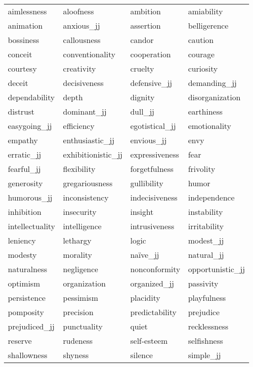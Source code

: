 \begin{table}[tbp]
    \begin{tabular}{| llll |}
        \hline
        aimlessness & aloofness & ambition & amiability \\
        animation & anxious\_jj & assertion & belligerence \\
        bossiness & callousness & candor & caution \\
        conceit & conventionality & cooperation & courage \\
        courtesy & creativity & cruelty & curiosity \\
        deceit & decisiveness & defensive\_jj & demanding\_jj \\
        dependability & depth & dignity & disorganization \\
        distrust & dominant\_jj & dull\_jj & earthiness \\
        easygoing\_jj & efficiency & egotistical\_jj & emotionality \\
        empathy & enthusiastic\_jj & envious\_jj & envy \\
        erratic\_jj & exhibitionistic\_jj & expressiveness & fear \\
        fearful\_jj & flexibility & forgetfulness & frivolity \\
        generosity & gregariousness & gullibility & humor \\
        humorous\_jj & inconsistency & indecisiveness & independence \\
        inhibition & insecurity & insight & instability \\
        intellectuality & intelligence & intrusiveness & irritability \\
        leniency & lethargy & logic & modest\_jj \\
        modesty & morality & naïve\_jj & natural\_jj \\
        naturalness & negligence & nonconformity & opportunistic\_jj \\
        optimism & organization & organized\_jj & passivity \\
        persistence & pessimism & placidity & playfulness \\
        pomposity & precision & predictability & prejudice \\
        prejudiced\_jj & punctuality & quiet & recklessness \\
        reserve & rudeness & self-esteem & selfishness \\
        shallowness & shyness & silence & simple\_jj \\

\end{tabular}
\end{table}

